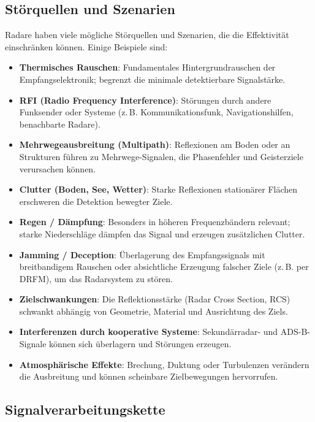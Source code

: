 \subsection{Störquellen und Szenarien}
Radare haben viele mögliche Störquellen und Szenarien, die die Effektivität einschränken können.
Einige Beispiele sind:
\begin{itemize}
  \item \textbf{Thermisches Rauschen}: Fundamentales Hintergrundrauschen der Empfangselektronik; begrenzt die minimale detektierbare Signalstärke.
  \item \textbf{RFI (Radio Frequency Interference)}: Störungen durch andere Funksender oder Systeme (z.\,B. Kommunikationsfunk, Navigationshilfen, benachbarte Radare).
  \item \textbf{Mehrwegeausbreitung (Multipath)}: Reflexionen am Boden oder an Strukturen führen zu Mehrwege-Signalen, die Phasenfehler und Geisterziele verursachen können.
  \item \textbf{Clutter (Boden, See, Wetter)}: Starke Reflexionen stationärer Flächen erschweren die Detektion bewegter Ziele.
  \item \textbf{Regen / Dämpfung}: Besonders in höheren Frequenzbändern relevant; starke Niederschläge dämpfen das Signal und erzeugen zusätzlichen Clutter.
  \item \textbf{Jamming / Deception}: Überlagerung des Empfangssignals mit breitbandigem Rauschen oder absichtliche Erzeugung falscher Ziele (z.\,B. per DRFM), um das Radarsystem zu stören.
  \item \textbf{Zielschwankungen}: Die Reflektionsstärke (Radar Cross Section, RCS) schwankt abhängig von Geometrie, Material und Ausrichtung des Ziels.
  \item \textbf{Interferenzen durch kooperative Systeme}: Sekundärradar- und ADS-B-Signale können sich überlagern und Störungen erzeugen.
  \item \textbf{Atmosphärische Effekte}: Brechung, Duktung oder Turbulenzen verändern die Ausbreitung und können scheinbare Zielbewegungen hervorrufen.
\end{itemize}

\subsection{Signalverarbeitungskette}
\usetikzlibrary{arrows.meta, positioning}

